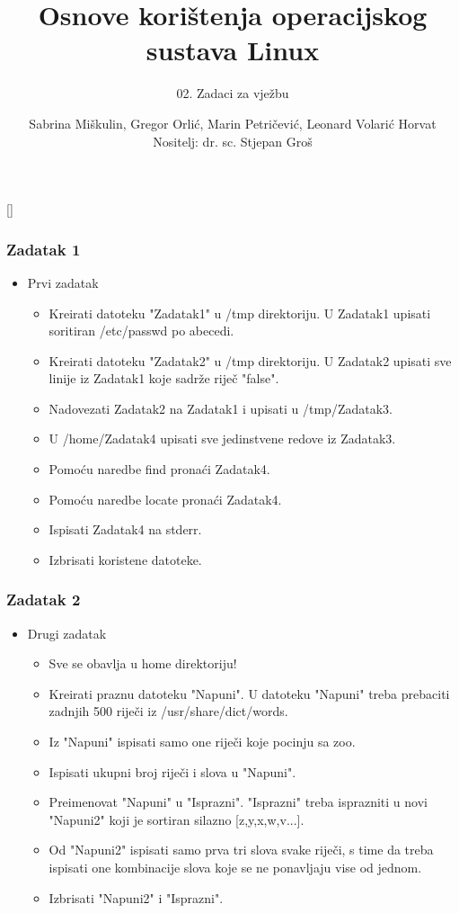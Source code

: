 \documentclass{beamer}
\title{Osnove korištenja operacijskog sustava Linux}
\subtitle{02. Zadaci za vježbu}
\author[Sabrina Miškulin, Gregor Orlić, Marin Petričević, Leonard Volarić Horvat]{Sabrina Miškulin, Gregor Orlić, Marin Petričević, Leonard Volarić Horvat\\{\small Nositelj: dr. sc. Stjepan Groš}}
\institute[FER]{Sveučilište u Zagrebu \\
				Fakultet elektrotehnike i računarstva}
\date{\todayiso}
\begin{document}
{
[] %

\begin{frame}
\maketitle
\end{frame}
}

\begin{frame}[t]
\frametitle{Zadatak 1}
\begin{itemize}
\item Prvi zadatak
\begin{itemize}
	\item Kreirati datoteku "Zadatak1" u /tmp direktoriju. U Zadatak1 upisati soritiran /etc/passwd po abecedi.
	\item Kreirati datoteku "Zadatak2" u /tmp direktoriju. U Zadatak2 upisati sve linije iz Zadatak1 koje sadrže riječ "false".
	\item Nadovezati Zadatak2 na Zadatak1 i upisati u /tmp/Zadatak3.
	\item U /home/Zadatak4 upisati sve jedinstvene redove iz Zadatak3.
	\item Pomoću naredbe find pronaći Zadatak4.
	\item Pomoću naredbe locate pronaći Zadatak4.
    \item Ispisati Zadatak4 na stderr.
    \item Izbrisati koristene datoteke.
\end{itemize}
\end{itemize}
\end{frame}

\begin{frame}[t]
\frametitle{Zadatak 2}
\begin{itemize}
\item Drugi zadatak
\begin{itemize}
	\item Sve se obavlja u home direktoriju!
	\item Kreirati praznu datoteku "Napuni". U datoteku "Napuni" treba prebaciti zadnjih
500 riječi iz /usr/share/dict/words.
	\item Iz "Napuni" ispisati samo one riječi koje pocinju sa zoo.
	\item Ispisati ukupni broj riječi i slova u "Napuni".
	\item Preimenovat "Napuni" u "Isprazni". "Isprazni" treba isprazniti u novi "Napuni2" koji je sortiran silazno [z,y,x,w,v...].
	\item Od "Napuni2" ispisati samo prva tri slova svake riječi, s time da treba ispisati one kombinacije slova koje se ne ponavljaju vise od jednom.
	\item Izbrisati "Napuni2" i "Isprazni".

\end{itemize}
\end{itemize}
\end{frame}
\end{document}
